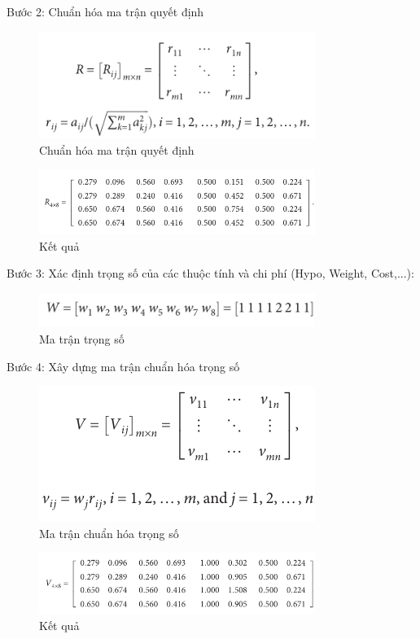 \documentclass{article}
\begin{document}
Bước 2: Chuẩn hóa ma trận quyết định
\begin{figure}[H]
    \centering
    \includegraphics[width=0.8\textwidth]{o9.png}
    \caption{Chuẩn hóa ma trận quyết định}
    \label{dongco}
\end{figure}
\begin{figure}[H]
    \centering
    \includegraphics[width=0.8\textwidth]{o10.png}
    \caption{Kết quả}
    \label{dongco}
\end{figure}
Bước 3: Xác định trọng số của các thuộc tính và chi phí (Hypo, Weight, Cost,...):
\begin{figure}[H]
    \centering
    \includegraphics[width=0.8\textwidth]{o11.png}
    \caption{Ma trận trọng số}
    \label{dongco}
\end{figure}
Bước 4: Xây dựng ma trận chuẩn hóa trọng số
\begin{figure}[H]
    \centering
    \includegraphics[width=0.8\textwidth]{o12.png}
    \caption{Ma trận chuẩn hóa trọng số}
    \label{dongco}
\end{figure}
\begin{figure}[H]
    \centering
    \includegraphics[width=0.8\textwidth]{o13.png}
    \caption{Kết quả}
    \label{dongco}
\end{figure}
\end{document}

